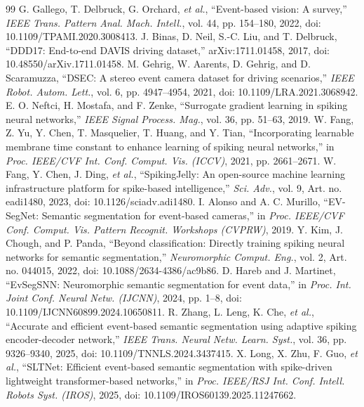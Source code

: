 \documentclass[preprint,12pt,number]{elsarticle}
\begin{document}
\begin{thebibliography}{99}
 G. Gallego, T. Delbruck, G. Orchard, \emph{et al.}, ``Event-based vision: A survey,'' \emph{IEEE Trans. Pattern Anal. Mach. Intell.}, vol. 44, pp. 154--180, 2022, doi: 10.1109/TPAMI.2020.3008413.
 J. Binas, D. Neil, S.-C. Liu, and T. Delbruck, ``DDD17: End-to-end DAVIS driving dataset,'' arXiv:1711.01458, 2017, doi: 10.48550/arXiv.1711.01458.
 M. Gehrig, W. Aarents, D. Gehrig, and D. Scaramuzza, ``DSEC: A stereo event camera dataset for driving scenarios,'' \emph{IEEE Robot. Autom. Lett.}, vol. 6, pp. 4947--4954, 2021, doi: 10.1109/LRA.2021.3068942.
 E. O. Neftci, H. Mostafa, and F. Zenke, ``Surrogate gradient learning in spiking neural networks,'' \emph{IEEE Signal Process. Mag.}, vol. 36, pp. 51--63, 2019.
 W. Fang, Z. Yu, Y. Chen, T. Masquelier, T. Huang, and Y. Tian, ``Incorporating learnable membrane time constant to enhance learning of spiking neural networks,'' in \emph{Proc. IEEE/CVF Int. Conf. Comput. Vis. (ICCV)}, 2021, pp. 2661--2671.
 W. Fang, Y. Chen, J. Ding, \emph{et al.}, ``SpikingJelly: An open-source machine learning infrastructure platform for spike-based intelligence,'' \emph{Sci. Adv.}, vol. 9, Art. no. eadi1480, 2023, doi: 10.1126/sciadv.adi1480.
 I. Alonso and A. C. Murillo, ``EV-SegNet: Semantic segmentation for event-based cameras,'' in \emph{Proc. IEEE/CVF Conf. Comput. Vis. Pattern Recognit. Workshops (CVPRW)}, 2019.
 Y. Kim, J. Chough, and P. Panda, ``Beyond classification: Directly training spiking neural networks for semantic segmentation,'' \emph{Neuromorphic Comput. Eng.}, vol. 2, Art. no. 044015, 2022, doi: 10.1088/2634-4386/ac9b86.
 D. Hareb and J. Martinet, ``EvSegSNN: Neuromorphic semantic segmentation for event data,'' in \emph{Proc. Int. Joint Conf. Neural Netw. (IJCNN)}, 2024, pp. 1--8, doi: 10.1109/IJCNN60899.2024.10650811.
 R. Zhang, L. Leng, K. Che, \emph{et al.}, ``Accurate and efficient event-based semantic segmentation using adaptive spiking encoder-decoder network,'' \emph{IEEE Trans. Neural Netw. Learn. Syst.}, vol. 36, pp. 9326--9340, 2025, doi: 10.1109/TNNLS.2024.3437415.
 X. Long, X. Zhu, F. Guo, \emph{et al.}, ``SLTNet: Efficient event-based semantic segmentation with spike-driven lightweight transformer-based networks,'' in \emph{Proc. IEEE/RSJ Int. Conf. Intell. Robots Syst. (IROS)}, 2025, doi: 10.1109/IROS60139.2025.11247662.

\end{thebibliography}
\end{document}

